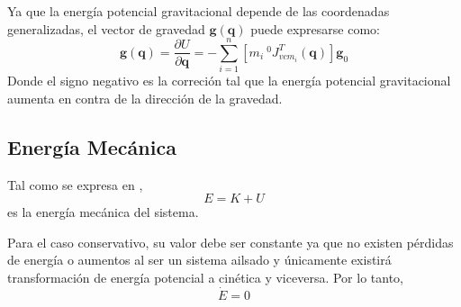     Ya que la energía potencial gravitacional depende de las coordenadas generalizadas, el vector de gravedad $\boldsymbol{g}(\boldsymbol{q})$ puede
    expresarse como:
    \begin{equation}
        \label{eqn:vector_gravedad}
        \boldsymbol{g}(\boldsymbol{q}) = \frac{\partial U}{\partial \boldsymbol{q}}=-\sum_{i=1}^n \left[m_i \: ^0J_{v{cm_i}}^T(\boldsymbol{q}) \right] \boldsymbol{g}_0
    \end{equation}
    Donde el signo negativo es la correción tal que la energía potencial gravitacional aumenta en contra de la dirección de la gravedad.

    \subsection{Energía Mecánica}
    Tal como se expresa en \cite{theoretical_minimun},
    \begin{equation}
        \label{eqn:energia_mecanica}
         E = K + U
    \end{equation}
    es la energía mecánica del sistema.
    
    Para el caso conservativo, su valor debe ser constante ya que no existen pérdidas de energía o aumentos al ser un sistema ailsado y
    únicamente existirá transformación de energía potencial a cinética y viceversa. Por lo tanto, 
    \begin{equation}
        \label{eqn:derivada_energia_mecanica}
         \dot{E} = 0
    \end{equation}